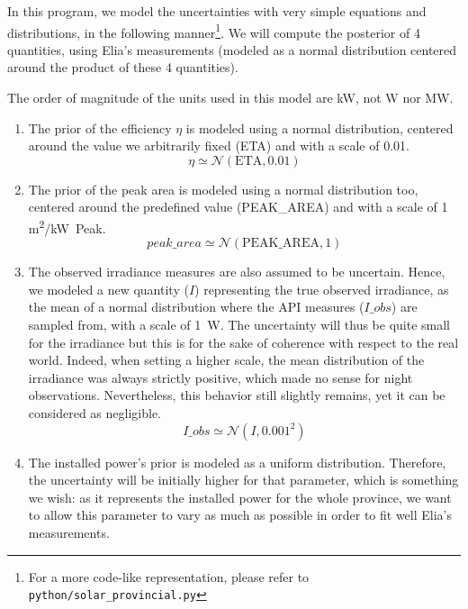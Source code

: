 \documentclass[a4paper, 12pt]{article}
\begin{document}
In this program, we model the uncertainties with very simple equations and distributions, in the following manner\footnote{For a more code-like representation, please refer to \texttt{python/solar\_provincial.py}}. We will compute the posterior of 4 quantities, using Elia's measurements (modeled as a normal distribution centered around the product of these 4 quantities). 
\begin{note}
    The order of magnitude of the units used in this model are \si{\kilo\watt}, not \si{\watt} nor \si{\mega\watt}.
\end{note}
\begin{enumerate}
    \item The prior of the efficiency $\eta$ is modeled using a normal distribution, centered around the value we arbitrarily fixed (ETA) and with a scale of 0.01.
    \begin{equation*}
        \eta \simeq \mathcal{N}(\text{ETA}, 0.01)
    \end{equation*}
    \item The prior of the peak area is modeled using a normal distribution too, centered around the predefined value (PEAK\_AREA) and with a scale of 1 \si{\meter\squared/\kilo\watt Peak}.
    \begin{equation*}
        peak\_area \simeq \mathcal{N}(\text{PEAK\_AREA}, 1)
    \end{equation*}
    \item The observed irradiance measures are also assumed to be uncertain. Hence, we modeled a new quantity ($I$) representing the true observed irradiance, as the mean of a normal distribution where the API measures ($I\_obs$) are sampled from, with a scale of \SI{1}{\watt}. The uncertainty will thus be quite small for the irradiance but this is for the sake of coherence with respect to the real world. Indeed, when setting a higher scale, the mean distribution of the irradiance was always strictly positive, which made no sense for night observations. Nevertheless, this behavior still slightly remains, yet it can be considered as negligible.
    \begin{equation*}
        I\_obs \simeq \mathcal{N}(I, 0.001^2)
    \end{equation*}
    \item The installed power's prior is modeled as a uniform distribution. Therefore, the uncertainty will be initially higher for that parameter, which is something we wish: as it represents the installed power for the whole province, we want to allow this parameter to vary as much as possible in order to fit well Elia's measurements.
\end{enumerate}
\end{document}
